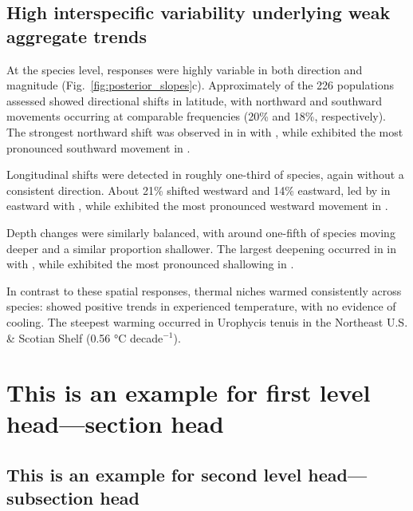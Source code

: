 \documentclass[lineno,pdflatex,sn-nature]{sn-jnl}%
\begin{document}
\subsection{High interspecific variability underlying weak aggregate trends}



\inpu

At the species level, responses were highly variable in both direction and magnitude (Fig.~\ref{fig:posterior_slopes}c). Approximately \LatPerc of the 226 populations assessed showed directional shifts in latitude, with northward and southward movements occurring at comparable frequencies (20\% and 18\%, respectively). The strongest northward shift was observed in \MaxLatSpecies in \MaxLatRegion with \MaxLatMedian \MaxLatCI, while \MinLatSpecies exhibited the most pronounced southward movement in \MinLatRegion \MinLatMedian \MinLatCI.

Longitudinal shifts were detected in roughly one-third of species, again without a consistent direction. About 21\% shifted westward and 14\% eastward, led by \MaxLonSpecies in \MaxLonRegion eastward with \MaxLonMedian \MaxLonCI, while \MinLonSpecies exhibited the most pronounced westward movement in \MinLonRegion \MinLonMedian \MinLonCI.

Depth changes were similarly balanced, with around one-fifth of species moving deeper and a similar proportion shallower. The largest deepening occurred in \MaxDepthSpecies in \MaxDepthRegion  with \MaxDepthMedian \MaxDepthCI, while \MinDepthSpecies exhibited the most pronounced shallowing in \MinDepthRegion \MinDepthMedian \MinDepthCI.

In contrast to these spatial responses, thermal niches warmed consistently across species: \ThermalPerc{} showed positive trends in experienced temperature, with no evidence of cooling. The steepest warming occurred in Urophycis tenuis in the Northeast U.S. \& Scotian Shelf (0.56 °C decade$^{-1}$).

\section{This is an example for first level head---section head}\label{sec3}

\subsection{This is an example for second level head---subsection head}\label{subsec2}
\end{document}
